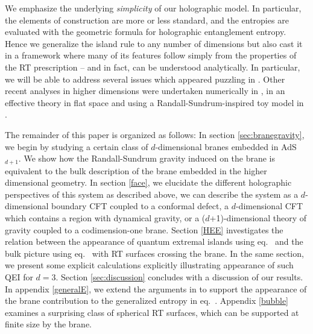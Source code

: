 \begin{figure}[h]
	\def\svgwidth{1\linewidth}
\end{figure}

We emphasize the underlying \textit{simplicity} of our holographic model. In particular, the elements of construction are more or less standard, and the entropies are evaluated with the geometric formula for holographic entanglement entropy. Hence we generalize the island rule to any number of dimensions but also cast it in a framework where many of its features follow simply from the properties of the RT prescription -- and in fact, can be understood analytically. In particular, we will be able to address several issues which appeared puzzling in \cite{Almheiri:2019hni}. Other recent analyses in higher dimensions were undertaken numerically in \cite{Almheiri:2019psy}, in an effective theory in flat space \cite{Hashimoto:2020cas} and using a Randall-Sundrum-inspired toy model in \cite{Geng:2020qvw}.

The remainder of this paper is organized as follows: In section \ref{sec:branegravity}, we begin by studying a certain class of $d$-dimensional branes embedded in AdS$_{d+1}$. We show how the Randall-Sundrum gravity induced on the brane is equivalent to the bulk description of the brane embedded in the higher dimensional geometry. In section \ref{face}, we elucidate the different holographic perspectives of this system as described above, \ie we can describe the system as a $d$-dimensional boundary CFT coupled to a conformal defect, a $d$-dimensional CFT which contains a region with dynamical gravity, or a ($d$+1)-dimensional theory of gravity coupled to a codimension-one brane. Section \ref{HEE} investigates the relation between the appearance of quantum extremal islands using eq.~ and the bulk picture using eq.~ with RT surfaces crossing the brane. In the same section, we present some explicit calculations explicitly illustrating appearance of such QEI for $d=3$. Section \ref{sec:discussion} concludes with a discussion of our results. In appendix \ref{generalE}, we extend  the arguments in \cite{Myers:2010tj} to support the appearance of the brane contribution to the generalized entropy in eq.~. Appendix \ref{bubble} examines a surprising class of spherical RT surfaces, which can be supported at finite size by the brane. 

